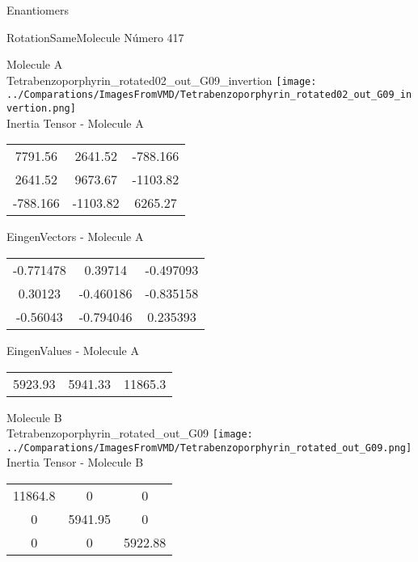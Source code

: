 \begin{center}
\vtab
\vtab
\textcolor{NavyBlue}{\Large Enantiomers}
\end{center}

 \newpage

\vtab[-2cm]
\begin{center}
{\large RotationSameMolecule \tab Número 417}
\end{center}
\begin{multicols}{2}
\begin{center}

Molecule A \\ 
Tetrabenzoporphyrin\_rotated02\_out\_G09\_invertion
\texttt{[image: ../Comparations/ImagesFromVMD/Tetrabenzoporphyrin\_rotated02\_out\_G09\_invertion.png]}
\\
Inertia Tensor - Molecule A \\
\vtab

\begin{tabular}{|c c c|}
7791.56	 & 	2641.52	 & 	-788.166	 \\
2641.52	 & 	9673.67	 & 	-1103.82	 \\
-788.166	 & 	-1103.82	 & 	6265.27
\end{tabular}

\vtab
 EingenVectors - Molecule A     \\
\vtab
\begin{tabular}{|c c c|}
-0.771478	 & 	0.39714	 & 	-0.497093	 \\
0.30123	 & 	-0.460186	 & 	-0.835158	 \\
-0.56043	 & 	-0.794046	 & 	0.235393
\end{tabular}

\vtab
 EingenValues - Molecule A     \\
\vtab
\begin{tabular}{|c c c|}
5923.93	 & 	5941.33	 & 	11865.3	 \\
\end{tabular}
\columnbreak

Molecule B \\ 
Tetrabenzoporphyrin\_rotated\_out\_G09
\texttt{[image: ../Comparations/ImagesFromVMD/Tetrabenzoporphyrin\_rotated\_out\_G09.png]}
\\
Inertia Tensor - Molecule B \\
\vtab

\begin{tabular}{|c c c|}
11864.8	 & 	0	 & 	0	 \\
0	 & 	5941.95	 & 	0	 \\
0	 & 	0	 & 	5922.88
\end{tabular}


\end{center}
\end{multicols}
